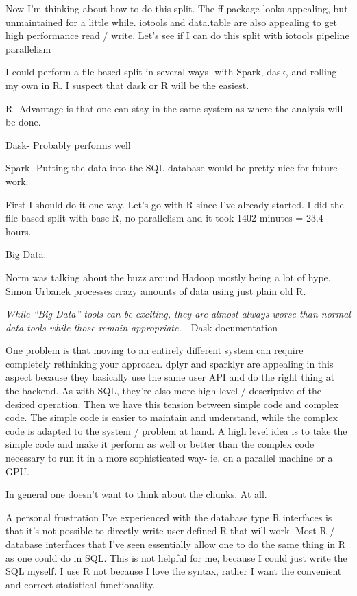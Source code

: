 \documentclass[12pt]{article}
\begin{document}
Now I'm thinking about how to do this split. The ff package looks
appealing, but unmaintained for a little while. iotools and data.table
are also appealing to get high performance read / write. Let's see if I
can do this split with iotools pipeline parallelism

I could perform a file based split in several ways- with Spark, dask, and
rolling my own in R. I suspect that dask or R will be the easiest.

R- Advantage is that one can stay in the same system as where the analysis
will be done. 

Dask- Probably performs well

Spark- Putting the data into the SQL database would be pretty nice for
future work.

First I should do it one way. Let's go with R since I've already started.
I did the file based split with base R, no parallelism and it took 1402 minutes = 23.4 hours.

Big Data:

Norm was talking about the buzz around Hadoop mostly being a lot of hype.
Simon Urbanek processes crazy amounts of data using just plain old R.

\emph{While “Big Data” tools can be exciting, they are almost always worse than
normal data tools while those remain appropriate.} - Dask documentation

One problem is that moving to an entirely different system can require
completely rethinking your approach. dplyr and sparklyr are appealing in this
aspect because they basically use the same user API and do the right
thing at the backend. As with SQL, they're also more high level / descriptive of the
desired operation. Then we have this tension between simple code and
complex code. The simple code is easier to maintain and understand, while
the complex code is adapted to the system / problem at hand. A high level
idea is to take the simple code and make it perform as well or better than
the complex code necessary to run it in a more sophisticated way- ie. on a
parallel machine or a GPU.

In general one doesn't want to think about the chunks. At all.

A personal frustration I've experienced with the database type R interfaces
is that it's not possible to directly write user defined R that will work.
Most R / database interfaces that I've seen essentially allow one to do the
same thing in R as one could do in SQL. This is not helpful for me, because
I could just write the SQL myself. I use R not because I love the syntax,
rather I want the convenient and correct statistical functionality.
\end{document}
